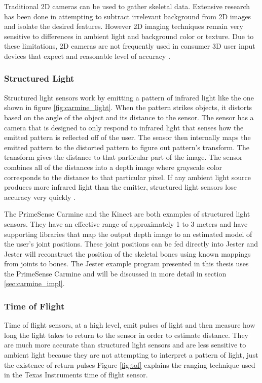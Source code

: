 Traditional 2D cameras can be used to gather skeletal data. Extensive research has been done in attempting to subtract irrelevant background from 2D images and isolate the desired features. However 2D imaging techniques remain very sensitive to differences in ambient light and background color or texture. Due to these limitations, 2D cameras are not frequently used in consumer 3D user input devices that expect and reasonable level of accuracy \cite{shimada2001real}.

\subsubsection{Structured Light}

Structured light sensors work by emitting a pattern of infrared light like the one shown in figure \ref{fig:carmine_light}. When the pattern strikes objects, it distorts based on the angle of the object and its distance to the sensor. The sensor has a camera that is designed to only respond to infrared light that senses how the emitted pattern is reflected off of the user. The sensor then internally maps the emitted pattern to the distorted pattern to figure out pattern’s transform. The transform gives the distance to that particular part of the image. The sensor combines all of the distances into a depth image where grayscale color corresponds to the distance to that particular pixel. If any ambient light source produces more infrared light than the emitter, structured light sensors lose accuracy very quickly \cite{scharstein2003high}.

The PrimeSense Carmine and the Kinect are both examples of structured light sensors. They have an effective range of approximately 1 to 3 meters and have supporting libraries that map the output depth image to an estimated model of the user’s joint positions. These joint positions can be fed directly into Jester and Jester will reconstruct the position of the skeletal bones using known mappings from joints to bones. The Jester example program presented in this thesis uses the PrimeSense Carmine and will be discussed in more detail in section \ref{sec:carmine_impl}.

\subsubsection{Time of Flight}

Time of flight sensors, at a high level, emit pulses of light and then measure how long the light takes to return to the sensor in order to estimate distance. They are much more accurate than structured light sensors and are less sensitive to ambient light because they are not attempting to interpret a pattern of light, just the existence of return pulses \cite{litime} Figure \ref{fig:tof} explains the ranging technique used in the Texas Instruments time of flight sensor. 

